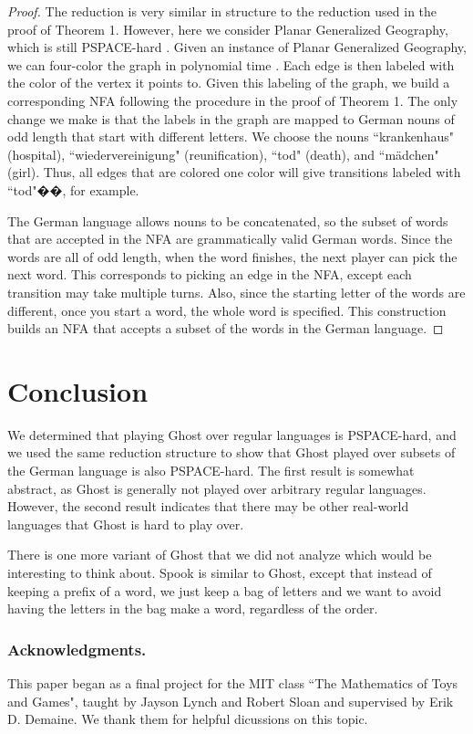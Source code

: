 \documentclass[runningheads,a4paper]{llncs}
\begin{document}
\begin{proof} The reduction is very similar in structure to the reduction used in the proof of Theorem 1. However, here we consider Planar Generalized Geography, which is still PSPACE-hard \cite{Sipser}. Given an instance of Planar Generalized Geography, we can four-color the graph in polynomial time \cite{planargraph}. Each edge is then labeled with the color of the vertex it points to. Given this labeling of the graph, we build a corresponding NFA following the procedure in the proof of Theorem 1. The only change we make is that the labels in the graph are mapped to German nouns of odd length that start with different letters. We choose the nouns ``krankenhaus" (hospital), ``wiedervereinigung" (reunification), ``tod" (death), and ``m{\"a}dchen" (girl). Thus, all edges that are colored one color will give transitions labeled with ``tod"��, for example. 

	The German language allows nouns to be concatenated, so the subset of words that are accepted in the NFA are grammatically valid German words. Since the words are all of odd length, when the word finishes, the next player can pick the next word. This corresponds to picking an edge in the NFA, except each transition may take multiple turns. Also, since the starting letter of the words are different, once you start a word, the whole word is specified. This construction builds an NFA that accepts a subset of the words in the German language. 
\end{proof}

\section{Conclusion}
\label{Conclusion}

We determined that playing Ghost over regular languages is PSPACE-hard, and we used the same reduction structure to show that Ghost played over subsets of the German language is also PSPACE-hard. The first result is somewhat abstract, as Ghost is generally not played over arbitrary regular languages. However, the second result indicates that there may be other real-world languages that Ghost is hard to play over.

There is one more variant of Ghost that we did not analyze which would be interesting to think about. Spook is similar to Ghost, except that instead of keeping a prefix of a word, we just keep a bag of letters and we want to avoid having the letters in the bag make a word, regardless of the order.

\subsubsection*{Acknowledgments.} This paper began as a final project for the MIT class ``The Mathematics of Toys and Games", taught by Jayson Lynch and Robert Sloan and supervised by Erik D. Demaine. We thank them for helpful dicussions on this topic.



\end{document}
